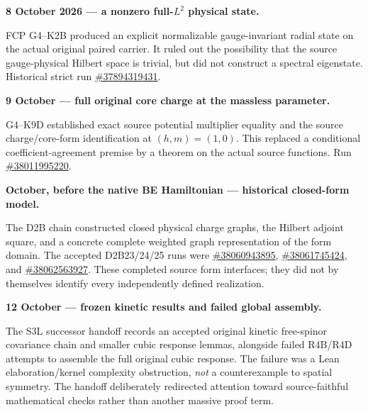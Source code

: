 \par\medskip\noindent\textbf{8 October 2026 --- a nonzero full-$L^2$ physical state.}\par\smallskip
FCP G4--K2B produced an explicit normalizable gauge-invariant radial
state on the actual original paired carrier. It ruled out the possibility
that the source gauge-physical Hilbert space is trivial, but did not
construct a spectral eigenstate. Historical strict run
\href{https://github.com/etblink/Foundational-Convergence-Program/actions/runs/37894319431}{\#37894319431}.

\par\medskip\noindent\textbf{9 October --- full original core charge at the massless parameter.}\par\smallskip
G4--K9D established exact source potential multiplier equality and the
source charge/core-form identification at $(h,m)=(1,0)$. This replaced a
conditional coefficient-agreement premise by a theorem on the actual
source functions. Run
\href{https://github.com/etblink/Foundational-Convergence-Program/actions/runs/38011995220}{\#38011995220}.

\par\medskip\noindent\textbf{October, before the native BE Hamiltonian --- historical closed-form model.}\par\smallskip
The D2B chain constructed closed physical charge graphs, the Hilbert
adjoint square, and a concrete complete weighted graph representation
of the form domain. The accepted D2B23/24/25 runs were
\href{https://github.com/etblink/Foundational-Convergence-Program/actions/runs/38060943895}{\#38060943895},
\href{https://github.com/etblink/Foundational-Convergence-Program/actions/runs/38061745424}{\#38061745424}, and
\href{https://github.com/etblink/Foundational-Convergence-Program/actions/runs/38062563927}{\#38062563927}.
These completed source form interfaces; they did not by themselves
identify every independently defined realization.

\par\medskip\noindent\textbf{12 October --- frozen kinetic results and failed global assembly.}\par\smallskip
The S3L successor handoff records an accepted original kinetic free-spinor
covariance chain and smaller cubic response lemmas, alongside failed
R4B/R4D attempts to assemble the full original cubic response. The
failure was a Lean elaboration/kernel complexity obstruction, \emph{not}
a counterexample to spatial symmetry. The handoff deliberately redirected
attention toward source-faithful mathematical checks rather than another
massive proof term.

